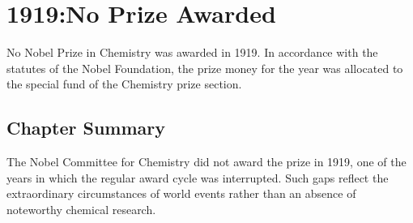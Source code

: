 \chapter{1919:No Prize Awarded}
\label{chap:chemistry1919}

No Nobel Prize in Chemistry was awarded in 1919. In accordance with the statutes of the Nobel Foundation, the prize money for the year was allocated to the special fund of the Chemistry prize section.

\section*{Chapter Summary}

The Nobel Committee for Chemistry did not award the prize in 1919, one of the years in which the regular award cycle was interrupted. Such gaps reflect the extraordinary circumstances of world events rather than an absence of noteworthy chemical research.
